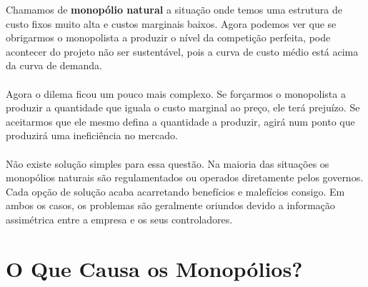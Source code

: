 \documentclass[a4paper,11pt,oneside]{book}
\theoremstyle{definition}
\theoremstyle{break}
\begin{document}
Chamamos de \textbf{monopólio natural} a situação onde temos uma estrutura de custo fixos muito alta e custos marginais baixos. Agora podemos ver que se obrigarmos o monopolista a produzir o nível da competição perfeita, pode acontecer do projeto não ser sustentável, pois a curva de custo médio está acima da curva de demanda.
\\
\\
Agora o dilema ficou um pouco mais complexo. Se forçarmos o monopolista a produzir a quantidade que iguala o custo marginal ao preço, ele terá prejuízo. Se aceitarmos que ele mesmo defina a quantidade a produzir, agirá num ponto que produzirá uma ineficiência no mercado.
\\
\\
Não existe solução simples para essa questão. Na maioria das situações os monopólios naturais são regulamentados ou operados diretamente pelos governos. Cada opção de solução acaba acarretando benefícios e malefícios consigo. Em ambos os casos, os problemas são geralmente oriundos devido a informação assimétrica entre a empresa e os seus controladores.

\section{O Que Causa os Monopólios?}
\end{document}
